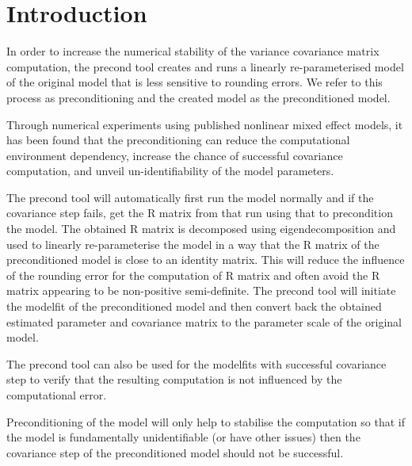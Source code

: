 
\usepackage{color}
\usepackage{amsmath}
\usepackage{tikz}
\usetikzlibrary{shapes,arrows}
\usepackage{hyperref}



\maketitle
\tableofcontents
\newpage

\section{Introduction}

In order to increase the numerical stability of the variance covariance matrix computation, the precond tool creates and runs a linearly re-parameterised model of the original model that is less sensitive to rounding errors.  We refer to this process as preconditioning and the created model as the preconditioned model. 

Through numerical experiments \cite{Aoki} using published nonlinear mixed effect models, it has been found that the preconditioning can reduce the computational environment dependency, increase the chance of successful covariance computation, and unveil un-identifiability of the model parameters.

The precond tool will automatically first run the model normally and if the covariance step fails, get the R matrix from that run using that to precondition the model. The obtained R matrix is decomposed using eigendecomposition and used to linearly re-parameterise the model in a way that the R matrix of the preconditioned model is close to an identity matrix.  This will reduce the influence of the rounding error for the computation of R matrix and often avoid the R matrix appearing to be non-positive semi-definite.  The precond tool will initiate the modelfit of the preconditioned model and then convert back the obtained estimated parameter and covariance matrix to the parameter scale of the original model.

The precond tool can also be used for the modelfits with successful covariance step to verify that the resulting computation is not influenced by the computational error.

Preconditioning of the model will only help to stabilise the computation so that if the model is fundamentally unidentifiable (or have other issues) then the covariance step of the preconditioned model should not be successful.

